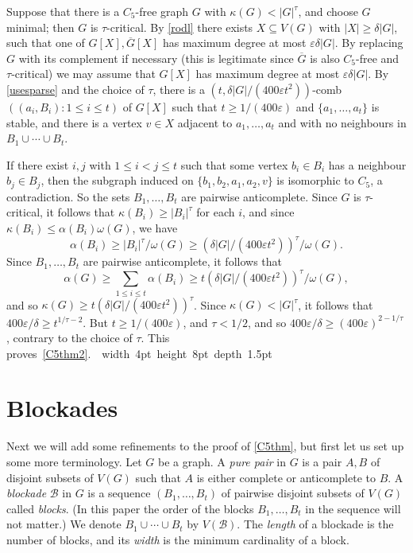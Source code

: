 \documentclass[titlepage,11pt]{article}
\newcommand\blackslug{\hbox{\hskip 1pt \vrule width 4pt height 8pt depth 1.5pt
        \hskip 1pt}}
\newcommand\bbox{\hfill \quad \blackslug \bigbreak}
\def\ll{,\ldots,}
\def\cupcup{\cup\cdots\cup}
\newcommand{\vare}{\varepsilon}
\begin{document}
Suppose that there is a  $C_5$-free graph $G$ with $\kappa(G)<|G|^\tau$, and choose $G$ minimal;
then $G$ is $\tau$-critical.
By \ref{rodl} there exists $X\subseteq V(G)$
with $|X|\ge \delta|G|$, such that one of $G[X], \overline{G}[X]$ has maximum degree at most $\vare\delta|G|$.
By replacing $G$ with its complement if necessary (this is legitimate since $\overline{G}$ is also $C_5$-free and $\tau$-critical)
we may assume that $G[X]$ has maximum degree at most $\vare\delta|G|$. By \ref{usesparse} and the choice of $\tau$, 
there is
a $(t,\delta|G|/(400\vare t^2))$-comb $((a_i,B_i):1\le i\le t)$ of $G[X]$ such that $t\ge 1/(400\vare)$ and $\{a_1\ll a_t\}$ is stable, and
there is a vertex $v\in X$ adjacent to $a_1\ll a_t$ and with
no neighbours in $B_1\cupcup B_t$.

If there exist $i,j$ with $1\le i<j\le t$ such that some vertex $b_i\in B_i$ has a neighbour $b_j\in B_j$, then the subgraph
induced on $\{b_1,b_2,a_1,a_2,v\}$ is isomorphic to $C_5$, a contradiction. So the sets $B_1\ll B_t$ are pairwise anticomplete. 
Since $G$ is $\tau$-critical, it follows that $\kappa(B_i)\ge |B_i|^\tau$ for each $i$, and since $\kappa(B_i)\le \alpha(B_i)\omega(G)$,
we have 
$$\alpha(B_i)\ge |B_i|^\tau/\omega(G)\ge (\delta|G|/(400\vare t^2))^\tau/\omega(G).$$ 
Since  $B_1\ll B_t$ are pairwise anticomplete, it follows that
$$\alpha(G)\ge \sum_{1\le i\le t}\alpha(B_i)\ge t (\delta|G|/(400\vare t^2))^\tau/\omega(G),$$
and so $\kappa(G)\ge t(\delta|G|/(400\vare t^2))^\tau$. Since $\kappa(G)<|G|^\tau$, it follows that
$400\vare/\delta \ge t^{1/\tau-2}$. But $t\ge 1/(400\vare)$, and $\tau<1/2$, and so
$400\vare/\delta \ge (400\vare)^{2-1/\tau}$,
contrary to the choice of $\tau$. This proves~\ref{C5thm2}.~\bbox

\section{Blockades}

Next we will add some refinements to the proof of \ref{C5thm}, but first
let us set up some more terminology. Let $G$ be a graph.
A {\em pure pair} in $G$ is a pair $A,B$ of disjoint subsets of $V(G)$ such that $A$ is either complete or anticomplete to $B$.
A {\em blockade} $\mathcal{B}$ in $G$ is a sequence $(B_1\ll B_t)$ of pairwise disjoint subsets
of $V(G)$ called {\em blocks}. (In
this paper the order of the blocks $B_1\ll B_t$ in the sequence will not matter.) We denote $B_1\cupcup B_t$ by
$V(\mathcal{B})$. The {\em length} of a blockade is the number of blocks, and its {\em width} is the minimum cardinality of a block.
\end{document}
